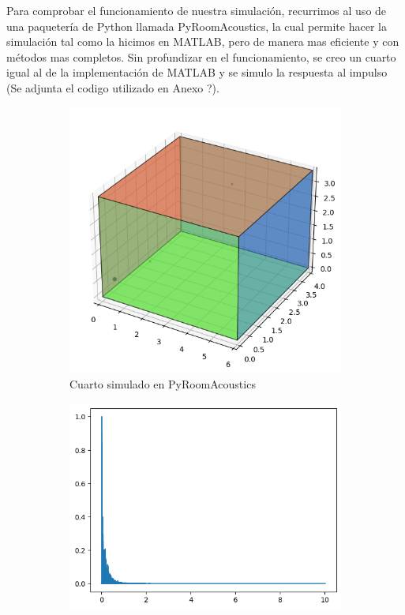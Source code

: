 \FloatBarrier
Para comprobar el funcionamiento de nuestra simulación, recurrimos al uso de una paquetería de Python llamada PyRoomAcoustics, la cual permite hacer la simulación tal como la hicimos en MATLAB, pero de manera mas eficiente y con métodos mas completos. Sin profundizar en el funcionamiento, se creo un cuarto igual al de la implementación de MATLAB y se simulo la respuesta al impulso (Se adjunta el codigo utilizado en Anexo ?).
\begin{figure}[!htb]
    \centering
    \begin{subfigure}{0.3\textwidth}
        \centering
        \includegraphics[width=\linewidth]{imagenes/PyRoom_Room.png}
        \caption{\footnotesize Cuarto simulado en PyRoomAcoustics}
        \label{fig:sub2_1}
    \end{subfigure}
    \hfill
    \begin{subfigure}{0.3\textwidth}
        \centering
        \includegraphics[width=\linewidth]{imagenes/PyRoom_RIR.png}

\end{subfigure}
\end{figure}

